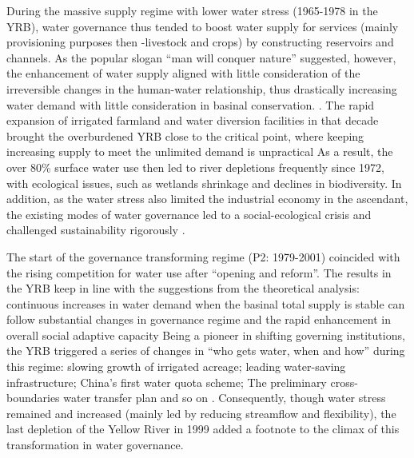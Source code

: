 During the massive supply regime with lower water stress (1965-1978 in the YRB), water governance thus tended to boost water supply for services (mainly provisioning purposes then -livestock and crops) by constructing reservoirs and channels.
As the popular slogan ``man will conquer nature'' suggested, however, the enhancement of water supply aligned with little consideration of the irreversible changes in the human-water relationship, thus drastically increasing water demand with little consideration in basinal conservation.
\cite{zhouDecelerationChinahuman2020}.
The rapid expansion of irrigated farmland and water diversion facilities in that decade brought the overburdened YRB close to the critical point, where keeping increasing supply to meet the unlimited demand is unpractical
As a result, the over 80\% surface water use then led to river depletions frequently since 1972, with ecological issues, such as wetlands shrinkage and declines in biodiversity.
In addition, as the water stress also limited the industrial economy in the ascendant, the existing modes of water governance led to a social-ecological crisis and challenged sustainability rigorously
\cite{wohlfartRiverBasinCourse2016}.

The start of the governance transforming regime (P2: 1979-2001) coincided with the rising competition for water use after ``opening and reform''.
The results in the YRB keep in line with the suggestions from the theoretical analysis: continuous increases in water demand when the basinal total supply is stable can follow substantial changes in governance regime and the rapid enhancement in overall social adaptive capacity %
Being a pioneer in shifting governing institutions, the YRB triggered a series of changes in ``who gets water, when and how'' during this regime: slowing growth of irrigated acreage; leading water-saving infrastructure; China's first water quota scheme; The preliminary cross-boundaries water transfer plan and so on
\cite{wangThirtyYearsYellow2018}.
Consequently, though water stress remained and increased (mainly led by reducing streamflow and flexibility), the last depletion of the Yellow River in 1999 added a footnote to the climax of this transformation in water governance.

